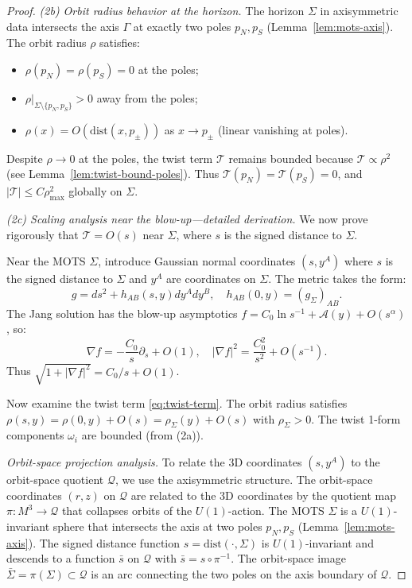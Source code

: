 \begin{proof}
\textit{(2b) Orbit radius behavior at the horizon.} The horizon $\Sigma$ in axisymmetric data intersects the axis $\Gamma$ at exactly two poles $p_N, p_S$ (Lemma~\ref{lem:mots-axis}). The orbit radius $\rho$ satisfies:
\begin{itemize}
    \item $\rho(p_N) = \rho(p_S) = 0$ at the poles;
    \item $\rho|_{\Sigma \setminus \{p_N, p_S\}} > 0$ away from the poles;
    \item $\rho(x) = O(\mathrm{dist}(x, p_\pm))$ as $x \to p_\pm$ (linear vanishing at poles).
\end{itemize}
Despite $\rho \to 0$ at the poles, the twist term $\mathcal{T}$ remains bounded because $\mathcal{T} \propto \rho^2$ (see Lemma~\ref{lem:twist-bound-poles}). Thus $\mathcal{T}(p_N) = \mathcal{T}(p_S) = 0$, and $|\mathcal{T}| \leq C\rho_{\max}^2$ globally on $\Sigma$.

\textit{(2c) Scaling analysis near the blow-up---detailed derivation.} We now prove rigorously that $\mathcal{T} = O(s)$ near $\Sigma$, where $s$ is the signed distance to $\Sigma$.

Near the MOTS $\Sigma$, introduce Gaussian normal coordinates $(s, y^A)$ where $s$ is the signed distance to $\Sigma$ and $y^A$ are coordinates on $\Sigma$. The metric takes the form:
\[
g = ds^2 + h_{AB}(s, y) dy^A dy^B, \quad h_{AB}(0, y) = (g_\Sigma)_{AB}.
\]
The Jang solution has the blow-up asymptotics $f = C_0 \ln s^{-1} + \mathcal{A}(y) + O(s^\alpha)$, so:
\[
\nabla f = -\frac{C_0}{s} \partial_s + O(1), \quad |\nabla f|^2 = \frac{C_0^2}{s^2} + O(s^{-1}).
\]
Thus $\sqrt{1 + |\nabla f|^2} = C_0/s + O(1)$.

Now examine the twist term \eqref{eq:twist-term}. The orbit radius satisfies $\rho(s, y) = \rho(0, y) + O(s) = \rho_\Sigma(y) + O(s)$ with $\rho_\Sigma > 0$. The twist 1-form components $\omega_i$ are bounded (from (2a)). 

\textit{Orbit-space projection analysis.} To relate the 3D coordinates $(s, y^A)$ to the orbit-space quotient $\mathcal{Q}$, we use the axisymmetric structure. The orbit-space coordinates $(r, z)$ on $\mathcal{Q}$ are related to the 3D coordinates by the quotient map $\pi: M^3 \to \mathcal{Q}$ that collapses orbits of the $U(1)$-action. The MOTS $\Sigma$ is a $U(1)$-invariant sphere that intersects the axis at two poles $p_N, p_S$ (Lemma~\ref{lem:mots-axis}). The signed distance function $s = \mathrm{dist}(\cdot, \Sigma)$ is $U(1)$-invariant and descends to a function $\bar{s}$ on $\mathcal{Q}$ with $\bar{s} = s \circ \pi^{-1}$. The orbit-space image $\bar{\Sigma} = \pi(\Sigma) \subset \mathcal{Q}$ is an arc connecting the two poles on the axis boundary of $\mathcal{Q}$.


\end{proof}
